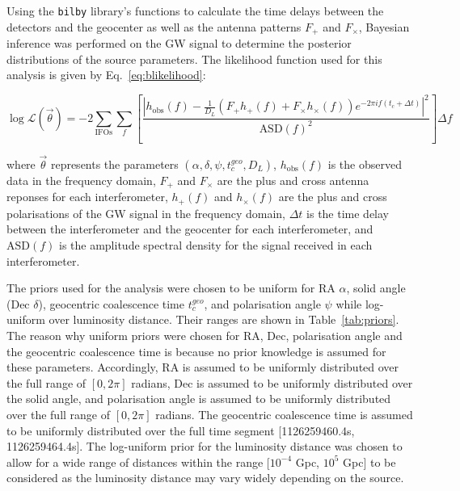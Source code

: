 \documentclass[11pt,a4paper]{article}
\begin{document}
Using the \texttt{bilby} library's functions to calculate the time delays between the detectors and the geocenter as well as the antenna patterns $F_\mathrm{+}$ and $F_\times$, Bayesian inference was performed on the GW signal to determine the posterior distributions of the source parameters. The likelihood function used for this analysis is given by Eq.~\ref{eq:blikelihood}:

\begin{equation}
    \log \mathcal{L}(\vec{\theta}) = 
    -2 \sum_{\text{IFOs}} \sum_{f}
    \left[
    \frac{\left| h_{\text{obs}}(f) - \frac{1}{D_L} \left( {F_+} h_+(f) + {F_\times} h_\times(f) \right) e^{-2\pi i f (t_c + \Delta t)} \right|^2}{\text{ASD}(f)^2}
    \right] \Delta f
    \label{eq:blikelihood}
\end{equation}    

where $\vec{\theta}$ represents the parameters $(\alpha, \delta, \psi, t_c^{geo}, D_L)$, $h_{\text{obs}}(f)$ is the observed data in the frequency domain, $F_+$ and $F_\times$ are the plus and cross antenna reponses for each interferometer, $h_+(f)$ and $h_\times(f)$ are the plus and cross polarisations of the GW signal in the frequency domain, $\Delta t$ is the time delay between the interferometer and the geocenter for each interferometer, and $\text{ASD}(f)$ is the amplitude spectral density for the signal received in each interferometer. 

The priors used for the analysis were chosen to be uniform for RA $\alpha$, solid angle (Dec $\delta$), geocentric coalescence time $t_c^{geo}$, and polarisation angle $\psi$ while log-uniform over luminosity distance. Their ranges are shown in Table~\ref{tab:priors}. The reason why uniform priors were chosen for RA, Dec, polarisation angle and the geocentric coalescence time is because no prior knowledge is assumed for these parameters. Accordingly, RA is assumed to be uniformly distributed over the full range of $[0, 2\pi]$ radians, Dec is assumed to be uniformly distributed over the solid angle, and polarisation angle is assumed to be uniformly distributed over the full range of $[0, 2\pi]$ radians. The geocentric coalescence time is assumed to be uniformly distributed over the full time segment [1126259460.4s, 1126259464.4s]. The log-uniform prior for the luminosity distance was chosen to allow for a wide range of distances within the range [$10^{-4}$ Gpc, $10^5$ Gpc] to be considered as the luminosity distance may vary widely depending on the source.
\end{document}
